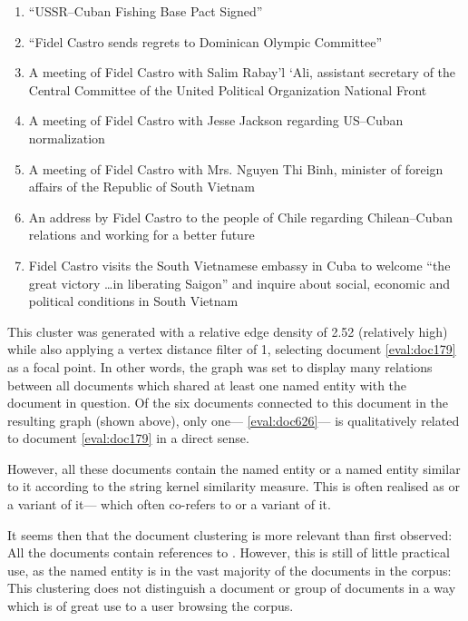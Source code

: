 \begin{enumerate}
\item ``USSR--Cuban Fishing Base Pact Signed''\label{eval:doc179}
\item ``Fidel Castro sends regrets to Dominican Olympic Committee''\label{eval:doc553}
\item A meeting of Fidel Castro with Salim Rabay'l `Ali, assistant secretary of the Central Committee of the United Political Organization National Front\label{eval:doc682}
\item A meeting of Fidel Castro with Jesse Jackson regarding US--Cuban normalization\label{eval:doc879}
\item A meeting of Fidel Castro with Mrs. Nguyen Thi Binh, minister of foreign affairs of the Republic of South Vietnam\label{eval:doc643}
\item An address by Fidel Castro to the people of Chile regarding Chilean--Cuban relations and working for a better future\label{eval:doc391}
\item Fidel Castro visits the South Vietnamese embassy in Cuba to welcome ``the great victory \ldots in liberating Saigon'' and inquire about social, economic and political conditions in South Vietnam\label{eval:doc626}
\end{enumerate} 

This cluster was generated with a relative edge density of 2.52 (relatively high) while also applying a vertex distance filter of 1, selecting document \ref{eval:doc179} as a focal point. In other words, the graph was set to display many relations between all documents which shared at least one named entity with the document in question. Of the six documents connected to this document in the resulting graph (shown above), only one--- \ref{eval:doc626}--- is qualitatively related to document \ref{eval:doc179} in a direct sense.

However, all these documents contain the named entity  or a named entity similar to it according to the string kernel similarity measure. This is often realised as  or a variant of it--- which often co-refers to  or a variant of it.

It seems then that the document clustering is more relevant than first observed: All the documents contain references to . However, this is still of little practical use, as the named entity  is in the vast majority of the documents in the corpus: This clustering does not distinguish a document or group of documents in a way which is of great use to a user browsing the corpus.

